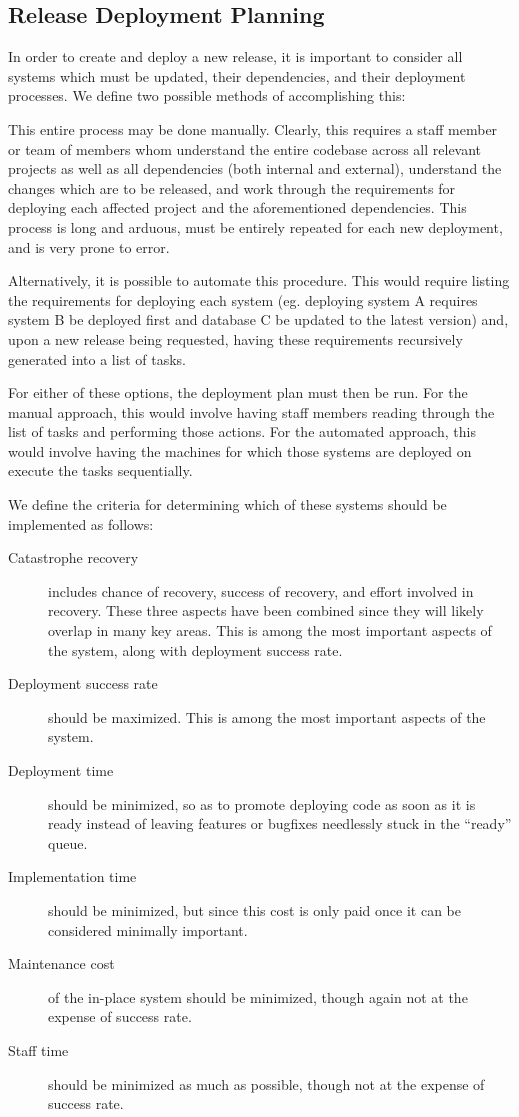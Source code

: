 \documentclass[12pt]{article}
\begin{document}
\subsection{Release Deployment Planning}
In order to create and deploy a new release, it is important to consider all systems which must be updated, their dependencies, and their deployment processes. We define two possible methods of accomplishing this:

This entire process may be done manually. Clearly, this requires a staff member or team of members whom understand the entire codebase across all relevant projects as well as all dependencies (both internal and external), understand the changes which are to be released, and work through the requirements for deploying each affected project and the aforementioned dependencies. This process is long and arduous, must be entirely repeated for each new deployment, and is very prone to error.

Alternatively, it is possible to automate this procedure. This would require listing the requirements for deploying each system (eg. deploying system A requires system B be deployed first and database C be updated to the latest version) and, upon a new release being requested, having these requirements recursively generated into a list of tasks.

For either of these options, the deployment plan must then be run. For the manual approach, this would involve having staff members reading through the list of tasks and performing those actions. For the automated approach, this would involve having the machines for which those systems are deployed on execute the tasks sequentially.

We define the criteria for determining which of these systems should be implemented as follows:
\begin{description}
\item[Catastrophe recovery] includes chance of recovery, success of recovery, and effort involved in recovery. These three aspects have been combined since they will likely overlap in many key areas. This is among the most important aspects of the system, along with deployment success rate.
\item[Deployment success rate] should be maximized. This is among the most important aspects of the system.
\item[Deployment time] should be minimized, so as to promote deploying code as soon as it is ready instead of leaving features or bugfixes needlessly stuck in the ``ready'' queue.
\item[Implementation time] should be minimized, but since this cost is only paid once it can be considered minimally important.
\item[Maintenance cost] of the in-place system should be minimized, though again not at the expense of success rate.
\item[Staff time] should be minimized as much as possible, though not at the expense of success rate.
\end{description}
\end{document}
